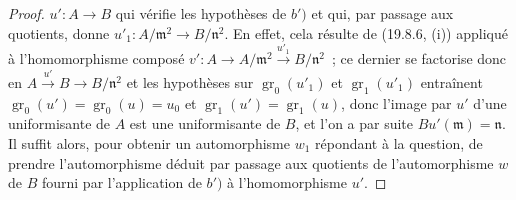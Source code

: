 \begin{proof}
$u':A\to B$ qui vérifie les hypothèses de $b')$ et qui, par passage aux quotients,
donne $u'_1:A/\mathfrak m^2\to B/\mathfrak n^2$. En effet, cela résulte de
(19.8.6, (i)) appliqué à l'homomorphisme composé
$v':A\to A/\mathfrak m^2\xrightarrow{u'_1}B/\mathfrak n^2$~;
ce dernier se factorise donc en $A\xrightarrow{u'}B\to B/\mathfrak n^2$ et
les hypothèses sur $\operatorname{gr}_0(u'_1)$ et
$\operatorname{gr}_1(u'_1)$ entraînent
$\operatorname{gr}_0(u')=\operatorname{gr}_0(u)=u_0$ et
$\operatorname{gr}_1(u')=\operatorname{gr}_1(u)$, donc l'image par $u'$ d'une
uniformisante de $A$ est une uniformisante de $B$, et l'on a par suite
$Bu'(\mathfrak m)=\mathfrak n$. Il suffit alors, pour obtenir un automorphisme
$w_1$ répondant à la question, de prendre l'automorphisme déduit par passage
aux quotients de l'automorphisme $w$ de $B$ fourni par l'application de $b')$
à l'homomorphisme $u'$.
\end{proof}
